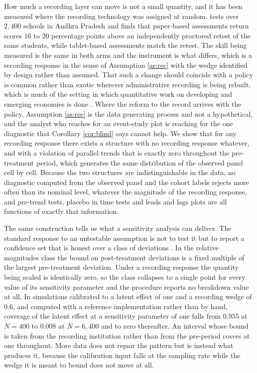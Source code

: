 \documentclass[12pt]{article}
\theoremstyle{definition}
\numberwithin{equation}{section}
\begin{document}
How much a recording layer can move is not a small quantity, and it has been
measured where the recording technology was assigned at random.
\citet{singh2024administrative} tests over $2{,}400$ schools in Andhra Pradesh
and finds that paper-based assessments return scores $16$ to $20$ percentage
points above an independently proctored retest of the same students, while
tablet-based assessments match the retest. The skill being measured is the same
in both arms and the instrument is what differs, which is a recording response
in the sense of Assumption \ref{as:rec} with the wedge identified by design
rather than assumed. That such a change should coincide with a policy is common
rather than exotic wherever administrative recording is being rebuilt, which is
much of the setting in which quantitative work on developing and emerging
economies is done \citep{singh2020myths}. Where the reform to the record arrives
with the policy, Assumption \ref{as:rec} is the data generating process and not
a hypothetical, and the analyst who reaches for an event-study plot is reaching
for the one diagnostic that Corollary \ref{cor:blind} says cannot help.
We show that for any recording response there exists a structure
with no recording response whatever, and with a violation of parallel trends that
is exactly zero throughout the pre-treatment period, which generates the same
distribution of the observed panel cell by cell. Because the two structures are
indistinguishable in the data, no diagnostic computed from the observed panel and
the cohort labels rejects more often than its nominal level, whatever
the magnitude of the recording response, and pre-trend tests, placebo in time
tests and leads and lags plots are all functions of exactly that information.

The same construction tells us what a sensitivity analysis can deliver. The
standard response to an untestable assumption is not to test it but to report a
confidence set that is honest over a class of deviations
\citep{rambachan2023credible}. In the relative magnitudes class the bound on post-treatment deviations is a fixed multiple of the largest pre-treatment deviation.
Under a recording response the quantity being scaled is identically zero, so the
class collapses to a single point for every value of its sensitivity parameter
and the procedure reports no breakdown value at all. In simulations calibrated to
a latent effect of one and a recording wedge of $0.6$, and computed with a
reference implementation rather than by hand, coverage of the latent effect at a
sensitivity parameter of one falls from $0.955$ at $N = 400$ to $0.008$ at
$N = 6{,}400$ and to zero thereafter. An interval whose bound is taken from the
recording institution rather than from the pre-period covers at one throughout.
More data does not repair the pattern but is instead what produces it, because
the calibration input falls at the sampling rate while the wedge it is meant to
bound does not move at all.
\end{document}
